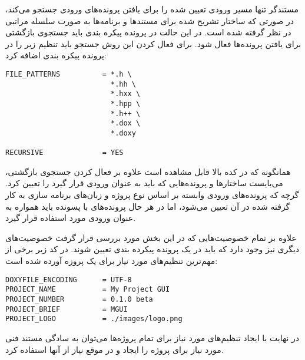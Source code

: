 مستندگر  تنها مسیر ورودی تعیین شده را برای یافتن پرونده‌های ورودی
جستجو می‌کند، در صورتی که ساختار تشریح شده برای مستندها و برنامه‌ها به صورت
سلسله مراتبی در نظر گرفته شده است. در این حالت در پرونده پیکره بندی باید جستجوی
بازگشتی برای یافتن پرونده‌ها فعال شود. برای فعال کردن این روش جستجو باید تنظیم
زیر را در پرونده پیکره بندی اضافه کرد:

\begin{latin}
\lstset{language=bash}  
\begin{lstlisting}[frame=single] 
FILE_PATTERNS          = *.h \
                         *.hh \
                         *.hxx \
                         *.hpp \
                         *.h++ \
                         *.dox \
                         *.doxy

RECURSIVE              = YES
\end{lstlisting}
\end{latin}

همانگونه که در کده بالا قابل مشاهده است علاوه بر فعال کردن جستجوی بازگشتی،
می‌بایست ساختارها و پرونده‌هایی که باید به عنوان ورودی قرار گیرد را تعیین کرد.
گرچه که پرونده‌های ورودی وابسته بر اساس نوع پروژه و زبان‌های برنامه سازی به کار
گرفته شده در آن تعیین می‌شود، اما در هر حال پرونده‌های با پسونده 
باید همواره به عنوان ورودی مورد استفاده قرار گیرد.

علاوه بر تمام خصوصیت‌هایی که در این بخش مورد بررسی قرار گرفت خصوصیت‌های دیگری
نیز وجود دارد که باید در یک پرونده پیکرده بندی تعیین شوند. در کد زیر  برخی از
مهم‌ترین تنظیم‌های مورد نیاز برای یک پروزه آورده شده است:

\begin{latin}
\lstset{language=bash}  
\begin{lstlisting}[frame=single] 
DOXYFILE_ENCODING      = UTF-8
PROJECT_NAME           = My Project GUI
PROJECT_NUMBER         = 0.1.0 beta
PROJECT_BRIEF          = MGUI
PROJECT_LOGO           = ./images/logo.png
\end{lstlisting}
\end{latin}

در نهایت با ایجاد تنظیم‌های مورد نیاز برای تمام پروژه‌ها می‌توان به سادگی مستند
فنی مورد نیاز برای پروژه را ایجاد و در موقع نیاز از آنها استفاده کرد.
